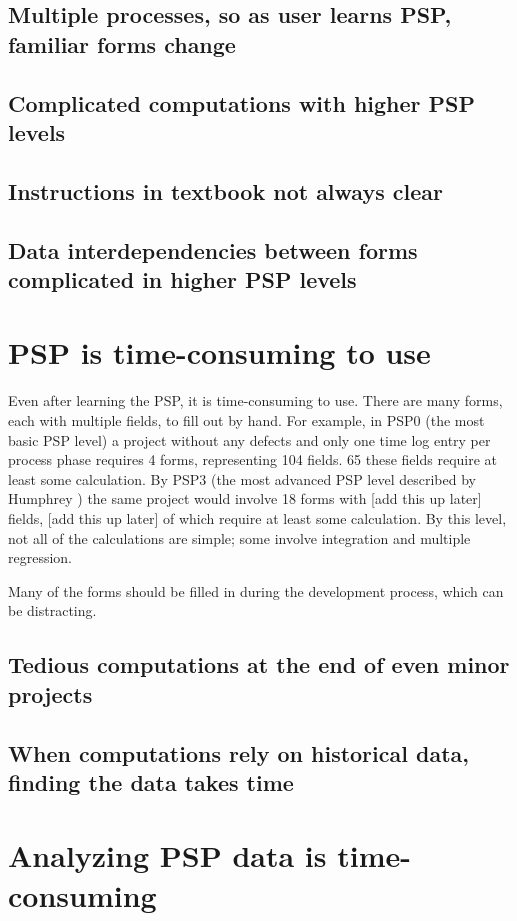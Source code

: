 \subsection{Multiple processes, so as user learns PSP, familiar forms change}
\subsection{Complicated computations with higher PSP levels}
\subsection{Instructions in textbook not always clear}
\subsection{Data interdependencies between forms complicated in higher PSP levels}
\section{PSP is time-consuming to use}

Even after learning the PSP, it is time-consuming to use.  There are many
forms, each with multiple fields, to fill out by hand.  For example, in
PSP0 (the most basic PSP level) a project without any defects and only one
time log entry per process phase
requires 4 forms, representing 104 fields. 65 these fields require at least
some calculation.  By PSP3 (the most advanced PSP
level described by Humphrey \cite{Humphrey95}) the same project would
involve 18 forms with [add this up later] fields, [add this up later] of which require at least some
calculation.  By this level, not all of the calculations are simple; some
involve integration and multiple regression.  

Many of the forms should be filled in during the development process, which
can be distracting.
 
\subsection{Tedious computations at the end of even minor projects}
\subsection{When computations rely on historical data, finding the data takes time}
\section{Analyzing PSP data is time-consuming}
